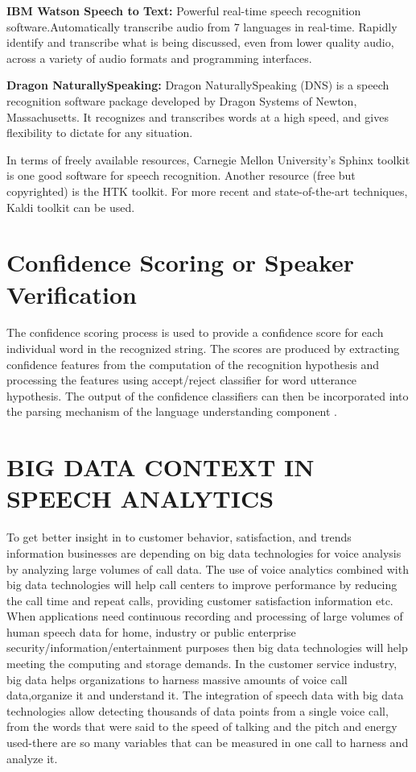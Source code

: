 \documentclass[sigconf]{acmart}
\begin{document}
\textbf{IBM Watson Speech to Text:} Powerful real-time speech recognition software.Automatically transcribe audio from 7 languages in real-time. Rapidly identify and transcribe what is being discussed, even from lower quality audio, across a variety of audio formats and programming interfaces. 

\textbf{Dragon NaturallySpeaking:} Dragon NaturallySpeaking (DNS) is a speech recognition software package developed by Dragon Systems of Newton, Massachusetts. It recognizes and transcribes words at a high speed, and gives flexibility to dictate for any situation. 

\par\null\par
In terms of freely available resources, Carnegie Mellon University's Sphinx toolkit is one good software for speech recognition. Another resource (free but copyrighted) is the HTK toolkit. For more recent and state-of-the-art techniques, Kaldi toolkit can be used.

\section{Confidence Scoring or Speaker Verification}
The confidence scoring process is used to provide a confidence score for each individual word in the recognized string. The scores are produced by extracting confidence features from the computation of the recognition hypothesis and processing the features using accept/reject classifier for word utterance hypothesis. The output of the confidence classifiers can then be incorporated into the parsing mechanism of the language understanding component \cite{Hazen2000}. 

\section{BIG DATA CONTEXT IN SPEECH ANALYTICS}
To get better insight in to customer behavior, satisfaction, and trends information businesses are depending on big data technologies for voice analysis by analyzing large volumes of call data. The use of voice analytics combined with big data technologies will help call centers to improve performance by reducing the call time and repeat calls, providing customer satisfaction information etc.
\newline
When applications need continuous recording and processing of large volumes of human speech data for home, industry or public enterprise security/information/entertainment purposes then big data technologies will help meeting the computing and storage demands. In the customer service industry, big data helps organizations to harness massive amounts of voice call data,organize it and understand it. The integration of speech data with big data technologies allow detecting thousands of data points from a single voice call, from the words that were said to the speed of talking and the pitch and energy used-there are so many variables that can be measured in one call to harness and analyze it.
\end{document}
